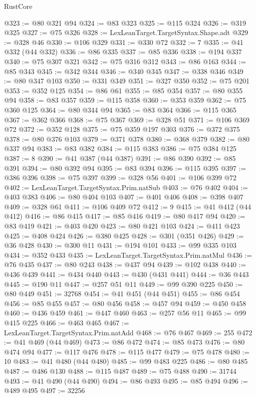 \begin{lexlean}{RustCore}
\begin{coremodule}
@323 := @80 @321 @94
@324 := @83 @323
@325 := @115 @324
@326 := @319 @325
@327 := @75 @326
@328 := LexLeanTarget.TargetSyntax.Shape.adt
@329 := @328 @46
@330 := @106 @329
@331 := @330 @72
@332 := 7
@335 := @41 @332 (@44 @332)
@336 := @86 @335
@337 := @85 @336
@338 := @194 @337
@340 := @75 @307 @321
@342 := @75 @316 @312
@343 := @86 @163
@344 := @85 @343
@345 := @342 @344
@346 := @340 @345
@347 := @338 @346
@349 := @80 @347 @103
@350 := @331 @349
@351 := @327 @350
@352 := @75 @201
@353 := @352 @125
@354 := @86 @61
@355 := @85 @354
@357 := @80 @355 @94
@358 := @83 @357
@359 := @115 @358
@360 := @353 @359
@362 := @75 @360 @125
@364 := @80 @344 @94
@365 := @83 @364
@366 := @115 @365
@367 := @362 @366
@368 := @75 @367
@369 := @328 @51
@371 := @106 @369 @72
@372 := @352 @128
@375 := @75 @359 @197 @303
@376 := @372 @375
@378 := @80 @376 @103
@379 := @371 @378
@380 := @368 @379
@382 := @80 @337 @94
@383 := @83 @382
@384 := @115 @383
@386 := @75 @384 @125
@387 := 8
@390 := @41 @387 (@44 @387)
@391 := @86 @390
@392 := @85 @391
@394 := @80 @392 @94
@395 := @83 @394
@396 := @115 @395
@397 := @386 @396
@398 := @75 @397
@399 := @328 @56
@401 := @106 @399 @72
@402 := LexLeanTarget.TargetSyntax.Prim.natSub
@403 := @76 @402
@404 := @403 @383
@406 := @80 @404 @103
@407 := @401 @406
@408 := @398 @407
@409 := @328 @61
@411 := @106 @409 @72
@412 := 9
@415 := @41 @412 (@44 @412)
@416 := @86 @415
@417 := @85 @416
@419 := @80 @417 @94
@420 := @83 @419
@421 := @403 @420
@423 := @80 @421 @103
@424 := @411 @423
@425 := @408 @424
@426 := @380 @425
@428 := @301 (@351 @426)
@429 := @36 @428
@430 := @300 @11
@431 := @194 @101
@433 := @99 @335 @103
@434 := @352 @433
@435 := LexLeanTarget.TargetSyntax.Prim.natMul
@436 := @76 @435
@437 := @80 @243
@438 := @437 @94
@439 := @102 @438
@440 := @436 @439
@441 := @434 @440
@443 := @430 (@431 @441)
@444 := @36 @443
@445 := @190 @11
@447 := @257 @51 @11
@449 := @99 @390 @225
@450 := @80 @449
@451 := 32768
@454 := @41 @451 (@44 @451)
@455 := @86 @454
@456 := @85 @455
@457 := @80 @456
@458 := @457 @94
@459 := @450 @458
@460 := @436 @459
@461 := @447 @460
@463 := @257 @56 @11
@465 := @99 @415 @225
@466 := @463 @465
@467 := LexLeanTarget.TargetSyntax.Prim.natAdd
@468 := @76 @467
@469 := 255
@472 := @41 @469 (@44 @469)
@473 := @86 @472
@474 := @85 @473
@476 := @80 @474 @94
@477 := @117 @476
@478 := @115 @477
@479 := @75 @478
@480 := 10
@483 := @41 @480 (@44 @480)
@485 := @99 @483 @225
@486 := @80 @485
@487 := @486 @130
@488 := @115 @487
@489 := @75 @488
@490 := 31744
@493 := @41 @490 (@44 @490)
@494 := @86 @493
@495 := @85 @494
@496 := @489 @495
@497 := 32256

\end{coremodule}
\end{lexlean}
